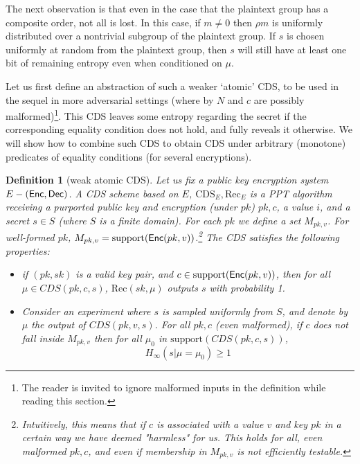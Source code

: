 \documentclass[11pt]{article}
\newtheorem{definition}[theorem]{Definition}
\newcommand{\enc}{{\sf Enc}}
\newcommand{\dec}{{\sf Dec}}
\newcommand{\support}{{\mathrm{support}}}
\begin{document}
The next observation is that even in the case that the plaintext
group has a composite order, not all is lost. In this case, if
$m\neq 0$ then $\rho m$ is uniformly distributed over a nontrivial
subgroup of the plaintext group. If $s$ is chosen uniformly at
random from the plaintext group, then $s$ will still have at least
one bit of remaining entropy even when conditioned on $\mu$.
 
Let us first define an abstraction of such a weaker `atomic' CDS, to be used in the sequel in more adversarial settings (where by $N$ and $c$ are possibly malformed)\footnote{The reader is invited to ignore malformed inputs in the definition while reading this section.}. This CDS leaves some entropy regarding the secret if the corresponding equality condition does not hold, and fully reveals it otherwise. We will show how to combine such CDS to obtain CDS under arbitrary (monotone) predicates of equality conditions (for several encryptions).

\begin{definition}[weak atomic CDS]\label{def-wa-cds}
	Let us fix a public key encryption system $E-(\enc,\dec)$. A CDS scheme based on $E$, $\text{CDS}_E,\text{Rec}_E$ is a PPT algorithm receiving a purported public key and encryption (under $pk$) $pk,c$, a value $i$, and a secret $s\in S$ (where $S$ is a finite domain). For each $pk$ we define a set $M_{pk,v}$. For well-formed $pk$, $M_{pk,v}=\support(\enc(pk,v))$.\footnote{Intuitively, this means that if $c$ is associated with a value $v$ and key $pk$ in a certain way we have deemed "harmless" for us. This holds for all, even malformed $pk,c$, and even if membership in $M_{pk,v}$ is not efficiently testable.}
	The CDS satisfies the following properties:
	\begin{itemize}
	\item[Correctness:] if $(pk,sk)$ is a valid key pair, and $c\in \support(\enc(pk,v))$, then for all $\mu \in CDS(pk,c,s)$, $\text{Rec}(sk,\mu)$ outputs $s$ with probability 1.
	\item[Hiding:] Consider an experiment where $s$ is sampled uniformly from $S$, and denote by $\mu$ the output of $CDS(pk,v,s)$. For all $pk,c$ (even malformed), if $c$ does not fall inside $M_{pk,v}$ then for all $\mu_0$ in $\support(CDS(pk,c,s))$,	
	\begin{equation}\label{eq-cds}
		H_\infty(s|\mu = \mu_0)\geq 1
	\end{equation}
	\end{itemize}
\end{definition} 
\end{document}
